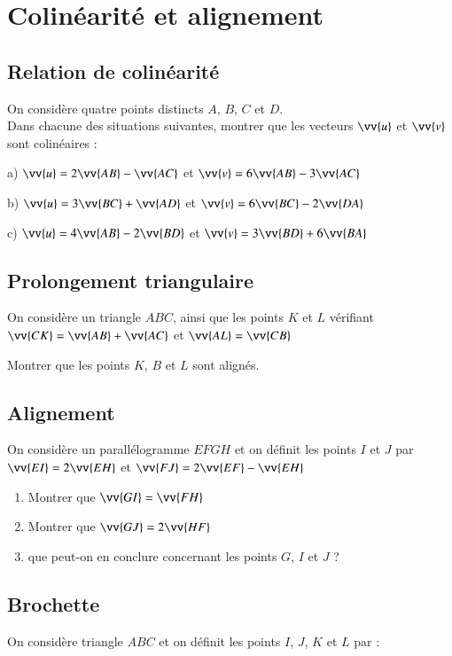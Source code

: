 \documentclass[oneside,12pt]{article}          %
\begin{document}
\section{Colinéarité et alignement}

\subsection{Relation de colinéarité}
On considère quatre points distincts $A$, $B$, $C$ et $D$.\\
Dans chacune des situations suivantes, montrer que les vecteurs $\vv{u}$ et $\vv{v}$ sont colinéaires :

a) $\vv{u}=2\vv{AB}-\vv{AC}$ \qquad et \qquad $\vv{v}=6\vv{AB}-3\vv{AC}$

b) $\vv{u}=3\vv{BC}+\vv{AD}$ \qquad et \qquad $\vv{v}=6\vv{BC}-2\vv{DA}$

c) $\vv{u}=4\vv{AB}-2\vv{BD}$ \qquad et \qquad $\vv{v}=3\vv{BD}+6\vv{BA}$



\subsection{Prolongement triangulaire}
On considère un triangle $ABC$, ainsi que les points $K$ et $L$ vérifiant $\vv{CK}=\vv{AB}+\vv{AC}$ et $\vv{AL}=\vv{CB}$

Montrer que les points $K$, $B$ et $L$ sont alignés.



\subsection{Alignement}
On considère un parallélogramme $EFGH$ et on définit les points $I$ et $J$ par  $\vv{EI}=2\vv{EH}$ et $\vv{FJ}=2\vv{EF}-\vv{EH}$
\begin{enumerate}
	\item Montrer que $\vv{GI}=\vv{FH}$
	\item Montrer que $\vv{GJ}=2\vv{HF}$
	\item que peut-on en conclure concernant les points $G$, $I$ et $J$ ?
\end{enumerate} 



\subsection{Brochette}
On considère triangle $ABC$ et on définit les points $I$, $J$, $K$ et $L$ par :
\end{document}

